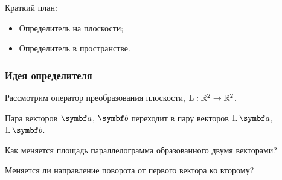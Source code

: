 
\begin{frame} %


\end{frame}



\begin{frame}{Краткий план:}
  \begin{itemize}[<+->]
    \item Определитель на плоскости;
    \item Определитель в пространстве.
  \end{itemize}

\end{frame}




\begin{frame}
    \frametitle{Идея определителя}

    Рассмотрим оператор преобразования плоскости, $\operatorname{L}: \mathbb{R}^2 \to \mathbb{R}^2$. 

    Пара векторов $\ba$, $\bb$ переходит в пару векторов $\LL\ba$, $\LL\bb$. 

    \pause

    Как меняется площадь параллелограмма образованного двумя векторами?

    \pause

    Меняется ли направление поворота от первого вектора ко второму?
\end{frame}




